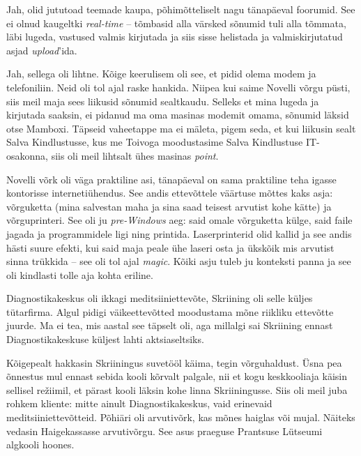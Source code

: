 
Jah, olid jututoad teemade kaupa, põhimõtteliselt nagu tänapäeval foorumid. 
See ei olnud kaugeltki \emph{real-time} -- tõmbasid 
alla värsked sõnumid tuli alla tõmmata, läbi lugeda, vastused valmis kirjutada ja siis sisse helistada ja valmiskirjutatud asjad \emph{upload}'ida. 


Jah, sellega oli lihtne. Kõige keerulisem oli see, et pidid olema modem ja 
telefoniliin. Neid oli tol ajal raske hankida. 
Niipea kui saime Novelli võrgu püsti, siis meil maja sees liikusid 
sõnumid sealtkaudu. Selleks et mina lugeda ja kirjutada saaksin, ei pidanud ma 
oma masinas modemit omama, sõnumid läksid otse Mamboxi. Täpseid vaheetappe ma ei mäleta, pigem seda, et kui liikusin 
sealt Salva Kindlustusse, kus me Toivoga moodustasime Salva Kindlustuse IT-osakonna, 
siis oli meil lihtsalt ühes masinas \emph{point}. 


Novelli võrk oli väga praktiline asi, tänapäeval on sama praktiline 
teha igasse kontorisse internetiühendus. See andis ettevõttele väärtuse 
mõttes kaks asja: võrguketta (mina salvestan maha ja sina saad teisest 
arvutist kohe kätte) ja võrguprinteri. See oli ju \emph{pre-Windows} aeg: 
said omale võrguketta külge, said faile jagada ja programmidele ligi ning 
printida. Laserprinterid olid kallid ja see andis hästi suure efekti, kui
said maja peale ühe laseri osta ja ükskõik mis arvutist sinna trükkida -- see oli 
tol ajal \emph{magic}. Kõiki asju tuleb ju konteksti panna ja see oli kindlasti tolle aja kohta eriline. 


Diagnostikakeskus oli 
ikkagi meditsiiniettevõte, Skriining oli selle küljes 
tütarfirma. Algul pidigi väikeettevõtted moodustama mõne
riikliku ettevõtte juurde. Ma ei tea, mis aastal see täpselt oli, aga 
millalgi sai Skriining ennast Diagnostikakeskuse küljest lahti aktsiaseltsiks. 

Kõigepealt hakkasin Skriiningus suvetööl käima, tegin võrguhaldust. Üsna pea 
õnnestus mul ennast sebida kooli kõrvalt palgale, nii et kogu keskkooliaja 
käisin sellisel režiimil, et pärast kooli läksin kohe linna 
Skriiningusse. Siis oli meil juba rohkem kliente: mitte ainult 
Diagnostikakeskus, vaid erinevaid meditsiiniettevõtteid. Põhiäri oli arvutivõrk, kas mõnes haiglas või mujal. Näiteks vedasin
Haigekassasse arvutivõrgu. See asus praeguse Prantsuse Lütseumi 
algkooli hoones. 

